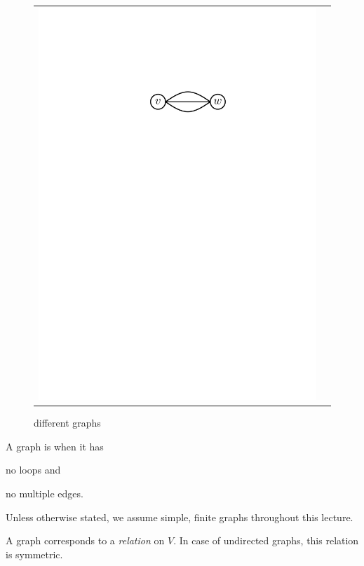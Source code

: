 \begin{figure}[htb]
\begin{tabular}{c c}
{	\includegraphics[scale=.5]{01_graph_theory/pics/graph_multiple-edges.pdf}
}
\end{tabular}
\caption{different graphs}
\end{figure}
\FloatBarrier

\begin{definition}
A graph is  when it has
\begin{compactitem}
\item no loops and 
\item no multiple edges.
\end{compactitem}
\end{definition}

Unless otherwise stated, we assume simple, finite graphs throughout this
lecture.

A graph corresponds to a \emph{relation} on $V$. In case of undirected graphs,
this relation is symmetric.


